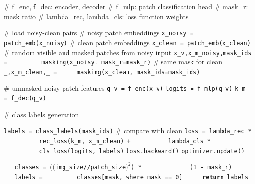 \begin{algorithm}[htbp]
    \caption{DenoMAE2.0, PyTorch-like pseudo code}
    \label{lst:DenoMAE2.0}
    \begin{algorithmic}[1]
    \small
    \Statex \textcolor{green!60!black}{\# f\_enc, f\_dec: encoder, decoder}
    \Statex \textcolor{green!60!black}{\# f\_mlp: patch classification head}
    \Statex \textcolor{green!60!black}{\# mask\_r: mask ratio}
    \Statex \textcolor{green!60!black}{\# lambda\_rec, lambda\_cls: loss function weights}
    \Statex
    
    \State \textcolor{green!60!black}{\# load noisy-clean pairs}
        \State \textcolor{green!60!black}{\# noisy patch embeddings}
        \State \texttt{x\_noisy = patch\_emb(x\_noisy)}  
         \State \textcolor{green!60!black}{\# clean patch embeddings}
        \State \texttt{x\_clean = patch\_emb(x\_clean)}  
        \text{}
        \State \textcolor{green!60!black}{\# random visible and masked patches from noisy input}
        \State \texttt{x\_v,x\_m\_noisy,mask\_ids = }
        \Statex \texttt{~~~~~~~~masking(x\_noisy,  mask\_r=mask\_r)}
        \State \textcolor{green!60!black}{\# same mask for clean}
        \State \texttt{\_,x\_m\_clean,\_ = }
        \Statex \texttt{~~~~masking(x\_clean, mask\_ids=mask\_ids)}

        \State \textcolor{green!60!black}{\# unmasked noisy patch features}
        \State \texttt{q\_v = f\_enc(x\_v)}
        \State \texttt{logits = f\_mlp(q\_v)}  \Comment{\textcolor{green!60!black}{ predicted patch labels}}
        \State \texttt{k\_m = f\_dec(q\_v)}  \Comment{\textcolor{green!60!black}{ pixels reconstruction}}

        \text{}
        
        \State \textcolor{green!60!black}{\# class labels generation}
        
        \State \texttt{labels = class\_labels(mask\_ids)} 
        \State \textcolor{green!60!black}{\# compare with clean}
        \State \texttt{loss = lambda\_rec *}
        \Statex  \texttt{~~~~~~~~~~rec\_loss(k\_m, x\_m\_clean) +}  
        \Statex \texttt{~~~~~~~~~~lambda\_cls * }
        \Statex \texttt{~~~~~~~~~~cls\_loss(logits, labels)}
        \State \texttt{loss.backward()}
        \State \texttt{optimizer.update()}  \Comment{\textcolor{green!60!black}{ optimizer update}}
    \EndFor

    \text{}
    \Statex {\textcolor{green!60!black}{\# label generalization for patches}}
        \State \texttt{~~~classes = $(($img\_size//patch\_size$)^2$) *}
        \Statex  \texttt{~~~~~~~~~~~~~(1 - mask\_r)}
        \State \texttt{~~~labels =} \Comment{\textcolor{green!60!black}{ 0: visible, 1: masked}}
        \Statex \texttt{~~~~~~~~~classes[mask, where mask == 0]}  
        \State \texttt{{\bf ~~~~~return} labels}
    \Statex


\end{algorithmic}
\end{algorithm}

